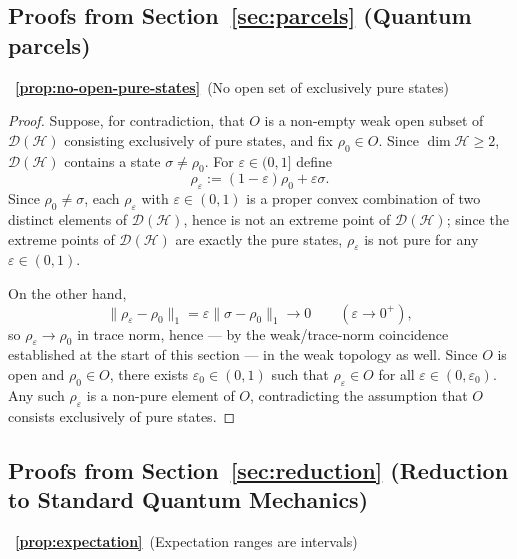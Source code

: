 \documentclass[11pt, onecolumn]{article}
\begin{document}
\subsection*{Proofs from Section~\ref{sec:parcels} (Quantum parcels)}

~{\bf \ref{prop:no-open-pure-states}}~(No open set of exclusively pure states)

\begin{proof}
Suppose, for contradiction, that $O$ is a non-empty weak open subset of $\mathcal D(\mathcal H)$ consisting exclusively of pure states, and fix $\rho_0\in O$. Since $\dim\mathcal H\ge2$, $\mathcal D(\mathcal H)$ contains a state $\sigma\ne\rho_0$. For $\varepsilon\in(0,1]$ define
\[
\rho_\varepsilon := (1-\varepsilon)\rho_0+\varepsilon\sigma.
\]
Since $\rho_0\ne\sigma$, each $\rho_\varepsilon$ with $\varepsilon\in(0,1)$ is a proper convex combination of two distinct elements of $\mathcal D(\mathcal H)$, hence is not an extreme point of $\mathcal D(\mathcal H)$; since the extreme points of $\mathcal D(\mathcal H)$ are exactly the pure states, $\rho_\varepsilon$ is not pure for any $\varepsilon\in(0,1)$.

On the other hand,
\[
\|\rho_\varepsilon-\rho_0\|_1=\varepsilon\|\sigma-\rho_0\|_1\longrightarrow0
\qquad(\varepsilon\to0^+),
\]
so $\rho_\varepsilon\to\rho_0$ in trace norm, hence — by the weak/trace-norm coincidence established at the start of this section — in the weak topology as well. Since $O$ is open and $\rho_0\in O$, there exists $\varepsilon_0\in(0,1)$ such that $\rho_\varepsilon\in O$ for all $\varepsilon\in(0,\varepsilon_0)$. Any such $\rho_\varepsilon$ is a non-pure element of $O$, contradicting the assumption that $O$ consists exclusively of pure states.
\end{proof}

\subsection*{Proofs from Section~\ref{sec:reduction} (Reduction to Standard Quantum Mechanics)}

~{\bf \ref{prop:expectation}}~(Expectation ranges are intervals)
\end{document}
